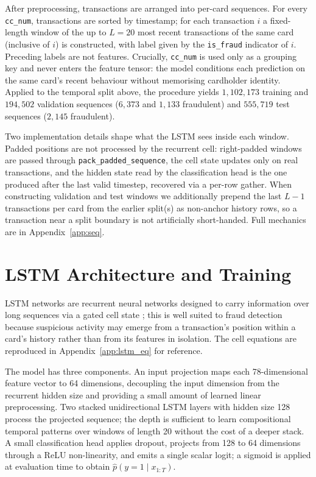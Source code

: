 \documentclass[oneside,12pt,parskip=half,american,numbers=noenddot]{scrreprt}
\begin{document}
After preprocessing, transactions are arranged into per-card sequences. For every \texttt{cc\_num}, transactions are sorted by timestamp; for each transaction $i$ a fixed-length window of the up to $L = 20$ most recent transactions of the same card (inclusive of $i$) is constructed, with label given by the \texttt{is\_fraud} indicator of $i$. Preceding labels are not features. Crucially, \texttt{cc\_num} is used only as a grouping key and never enters the feature tensor: the model conditions each prediction on the same card's recent behaviour without memorising cardholder identity. Applied to the temporal split above, the procedure yields $1{,}102{,}173$ training and $194{,}502$ validation sequences ($6{,}373$ and $1{,}133$ fraudulent) and $555{,}719$ test sequences ($2{,}145$ fraudulent).

Two implementation details shape what the LSTM sees inside each window. Padded positions are not processed by the recurrent cell: right-padded windows are passed through \texttt{pack\_padded\_sequence}, the cell state updates only on real transactions, and the hidden state read by the classification head is the one produced after the last valid timestep, recovered via a per-row gather. When constructing validation and test windows we additionally prepend the last $L - 1$ transactions per card from the earlier split(s) as non-anchor history rows, so a transaction near a split boundary is not artificially short-handed. Full mechanics are in Appendix~\ref{app:seq}.

\section{LSTM Architecture and Training}
\label{sec:lstm}

LSTM networks are recurrent neural networks designed to carry information over long sequences via a gated cell state \parencite{olah_understanding_2015}; this is well suited to fraud detection because suspicious activity may emerge from a transaction's position within a card's history rather than from its features in isolation. The cell equations are reproduced in Appendix~\ref{app:lstm_eq} for reference.

The model has three components. An input projection maps each 78-dimensional feature vector to 64 dimensions, decoupling the input dimension from the recurrent hidden size and providing a small amount of learned linear preprocessing. Two stacked unidirectional LSTM layers with hidden size 128 process the projected sequence; the depth is sufficient to learn compositional temporal patterns over windows of length 20 without the cost of a deeper stack. A small classification head applies dropout, projects from 128 to 64 dimensions through a ReLU non-linearity, and emits a single scalar logit; a sigmoid is applied at evaluation time to obtain $\hat{p}(y = 1 \mid x_{1:T})$.
\end{document}
